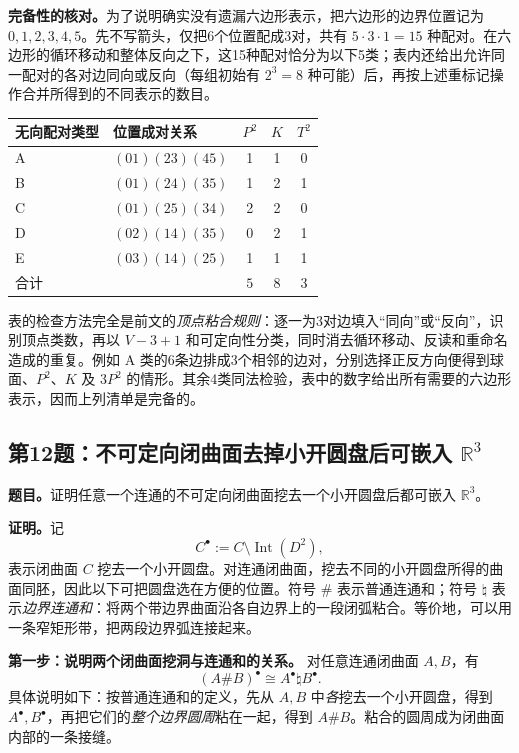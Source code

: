 \documentclass[UTF8,11pt,a4paper]{ctexart}
\newcommand{\R}{\mathbb R}
\begin{document}
\textbf{完备性的核对。}\;为了说明确实没有遗漏六边形表示，把六边形的边界位置记为 \(0,1,2,3,4,5\)。先不写箭头，仅把6个位置配成3对，共有
\(5\cdot3\cdot1=15\) 种配对。在六边形的循环移动和整体反向之下，这15种配对恰分为以下5类；表内还给出允许同一配对的各对边同向或反向（每组初始有 \(2^3=8\) 种可能）后，再按上述重标记操作合并所得到的不同表示的数目。
\begin{center}
\renewcommand{\arraystretch}{1.30}
\begin{tabular}{>{\centering\arraybackslash}m{2.1cm} >{\centering\arraybackslash}m{5.7cm} ccc}
\toprule
无向配对类型&位置成对关系&\(P^2\)&\(K\)&\(T^2\)\\\midrule
A&\((01)(23)(45)\)&1&1&0\\
B&\((01)(24)(35)\)&1&2&1\\
C&\((01)(25)(34)\)&2&2&0\\
D&\((02)(14)(35)\)&0&2&1\\
E&\((03)(14)(25)\)&1&1&1\\\midrule
合计& &\(5\)&\(8\)&\(3\)\\\bottomrule
\end{tabular}
\end{center}
表的检查方法完全是前文的\emph{顶点粘合规则}：逐一为3对边填入“同向”或“反向”，识别顶点类数，再以 \(V-3+1\) 和可定向性分类，同时消去循环移动、反读和重命名造成的重复。例如 A 类的6条边排成3个相邻的边对，分别选择正反方向便得到球面、\(P^2\)、\(K\) 及 \(3P^2\) 的情形。其余4类同法检验，表中的数字给出所有需要的六边形表示，因而上列清单是完备的。

\subsection*{第12题：不可定向闭曲面去掉小开圆盘后可嵌入 \(\R^3\)}
\textbf{题目。}\;证明任意一个连通的不可定向闭曲面挖去一个小开圆盘后都可嵌入 \(\R^3\)。

\textbf{证明。}\;记
\[
 C^\bullet:=C\setminus\operatorname{Int}(D^2),
\]
表示闭曲面 \(C\) 挖去一个小开圆盘。对连通闭曲面，挖去不同的小开圆盘所得的曲面同胚，因此以下可把圆盘选在方便的位置。符号 \(\#\) 表示普通连通和；符号 \(\natural\) 表示\emph{边界连通和}：将两个带边界曲面沿各自边界上的一段闭弧粘合。等价地，可以用一条窄矩形带，把两段边界弧连接起来。

\textbf{第一步：说明两个闭曲面挖洞与连通和的关系。}
对任意连通闭曲面 \(A,B\)，有
\[
 \boxed{\ (A\# B)^\bullet\cong A^\bullet\natural B^\bullet.\ }\tag{$*$}
\]
具体说明如下：按普通连通和的定义，先从 \(A,B\) 中\emph{各}挖去一个小开圆盘，得到 \(A^\bullet,B^\bullet\)，再把它们的\emph{整个边界圆周}粘在一起，得到 \(A\# B\)。粘合的圆周成为闭曲面内部的一条接缝。
\end{document}
